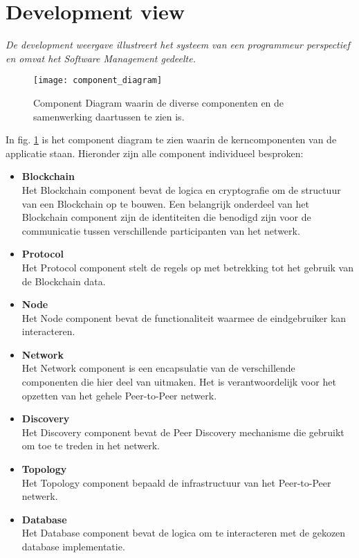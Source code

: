 \section{Development view}

\textit{De development weergave illustreert het systeem van een programmeur perspectief en omvat het Software Management gedeelte.}

\begin{figure}[h]
  \centering
  \texttt{[image: component\_diagram]}
  \caption[Component Diagram] {
    Component Diagram waarin de diverse componenten en de samenwerking daartussen te zien is.
  }
  \label{diagram:component}
\end{figure}

In fig. \ref{diagram:component} is het component diagram te zien waarin de kerncomponenten van de applicatie staan. Hieronder zijn alle component individueel besproken:

\begin{itemize}
  \item \textbf{Blockchain}
  \\ Het Blockchain component bevat de logica en cryptografie om de structuur van een Blockchain op te bouwen. Een belangrijk onderdeel van het Blockchain component zijn de identiteiten die benodigd zijn voor de communicatie tussen verschillende participanten van het netwerk.
  \item \textbf{Protocol}
  \\ Het Protocol component stelt de regels op met betrekking tot het gebruik van de Blockchain data.
  \item \textbf{Node}
  \\ Het Node component bevat de functionaliteit waarmee de eindgebruiker kan interacteren.
  \item \textbf{Network}
  \\ Het Network component is een encapsulatie van de verschillende componenten die hier deel van uitmaken. Het is verantwoordelijk voor het opzetten van het gehele Peer-to-Peer netwerk.
  \item \textbf{Discovery}
  \\ Het Discovery component bevat de Peer Discovery mechanisme die gebruikt om toe te treden in het netwerk.
  \item \textbf{Topology}
  \\ Het Topology component bepaald de infrastructuur van het Peer-to-Peer netwerk.
  \item \textbf{Database}
  \\ Het Database component bevat de logica om te interacteren met de gekozen database implementatie.
\end{itemize}